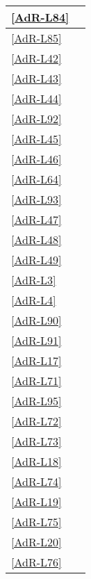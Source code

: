 \begin{longtable}{|>{\centering}P{5cm}|>{\centering}P{7cm}|}
	\hline \ref{AdR-L84} &  \tabularnewline
	\hline \ref{AdR-L85} &  \tabularnewline
	\hline \ref{AdR-L42} &  \tabularnewline
 	\hline \ref{AdR-L43} &  \tabularnewline
	\hline \ref{AdR-L44} &  \tabularnewline %
	\hline \ref{AdR-L92} &  \tabularnewline
	\hline \ref{AdR-L45} &  \tabularnewline
	\hline \ref{AdR-L46} &  \tabularnewline
	\hline \ref{AdR-L64} &  \tabularnewline
	\hline \ref{AdR-L93} &  \tabularnewline %
	\hline \ref{AdR-L47} &  \tabularnewline
	\hline \ref{AdR-L48} &  \tabularnewline
	\hline \ref{AdR-L49} &  \tabularnewline
	\hline \ref{AdR-L3} &  \tabularnewline
	\hline \ref{AdR-L4} &  \tabularnewline %
	\hline \ref{AdR-L90} &  \tabularnewline
	\hline \ref{AdR-L91} &  \tabularnewline %
	
	\hline \ref{AdR-L17} &  \tabularnewline %
	\hline \ref{AdR-L71} &  \tabularnewline %
	\hline \ref{AdR-L95} &  \tabularnewline
	\hline \ref{AdR-L72} &  \tabularnewline
	\hline \ref{AdR-L73} &  \tabularnewline
	\hline \ref{AdR-L18} &  \tabularnewline
	\hline \ref{AdR-L74} &  \tabularnewline %
	\hline \ref{AdR-L19} &  \tabularnewline
	\hline \ref{AdR-L75} &  \tabularnewline
	\hline \ref{AdR-L20} &  \tabularnewline
	\hline \ref{AdR-L76} &  \tabularnewline %
	

\end{longtable}
